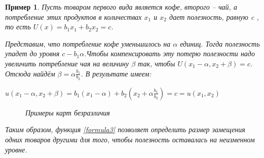 \documentclass[12pt, 4paper]{book}
\newtheorem{example}{\indent \color{blue} Пример}[chapter]
\begin{document}
{\begin{example}
\label{exam2.3}
\rm Пусть товаром первого вида является кофе, второго -- чай, а потребление этих продуктов в количествах $x_{1}$
и $x_{2}$ дает полезность, равную \textit{c} , то есть $U(x)= b_{1}x_{1}+b_{2}x_{2}=c$.
\par
Представим, что потребление кофе уменьшилось на $\alpha$ единиц. Тогда полезность упадет до уровня $c-b_{1} \alpha $.Чтобы компенсировать эту потерю полезности надо увеличить потребление чая на величину $\beta$ так, чтобы 
$U(x_{1}-\alpha, x_{2}+\beta)=c$. Отсюда найдём $\beta = \alpha \frac{b_{1}}{b_{2}}$. В результате имеем: 
\begin{center}
$u(x_{1}-\alpha,x_{2}+\beta)=b_{1}(x_{1}-\alpha)+b_{2}(x_{2}+\alpha \frac{b_{1}}{b_{2}})=c=u(x_{1},x_{2})$
\end{center}
\begin{figure}[h]	 
	\caption{Примеры карт безразличия}
	\label{image2.1}
\end{figure}
\par

Таким образом, функция \eqref{formula3} позволяет определить размер замещения одних товаров другими для того, чтобы полезность оставалась на неизменном уровне.
\par


\end{example}}
\end{document}
